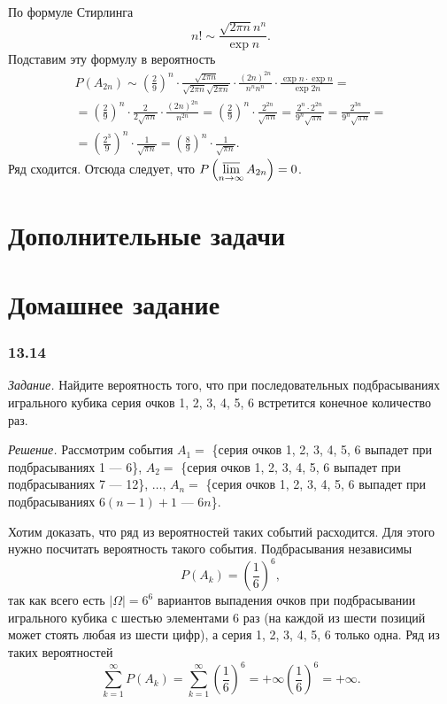 По формуле Стирлинга
$$n! \sim \frac{ \sqrt{2 \pi n} n^n}{\exp{n}}.$$
Подставим эту формулу в вероятность
\begin{equation*}
\begin{split}
P \left( A_{2n} \right) \sim
\left( \frac{2}{9} \right)^n \cdot
\frac{ \sqrt{2 \pi n}}{ \sqrt{2 \pi n} \sqrt{2 \pi n}} \cdot \frac{ \left( 2n \right)^{2n}}{n^n n^n} \cdot
\frac{\exp{n} \cdot \exp{n}}{ \exp{2n}} = \\
= \left( \frac{2}{9} \right)^n \cdot \frac{2}{2 \sqrt{ \pi n}} \cdot \frac{ \left( 2n \right)^{2n}}{n^{2n}} =
\left( \frac{2}{9} \right)^n \cdot \frac{2^{2n}}{ \sqrt{ \pi n}} =
\frac{2^n \cdot 2^{2n}}{9^n \sqrt{ \pi n}} =
\frac{2^{3n}}{9^n \sqrt{ \pi n}} = \\
= \left( \frac{2^3}{9} \right)^n \cdot \frac{1}{ \sqrt{ \pi n}} =
\left( \frac{8}{9} \right)^n \cdot \frac{1}{ \sqrt{ \pi n}}.
\end{split}
\end{equation*}
Ряд сходится.
Отсюда следует, что $P \left( \varlimsup \limits_{n \to \infty } A_{2n} \right) = 0$.


\section*{Дополнительные задачи}

\section*{Домашнее задание}

\subsubsection*{13.14}

\textit{Задание.} Найдите вероятность того, что при последовательных подбрасываниях игрального кубика серия очков 1, 2, 3, 4, 5, 6 встретится конечное количество раз.

\textit{Решение.}
Рассмотрим события $A_1 =$ \{серия очков 1, 2, 3, 4, 5, 6 выпадет при подбрасываниях 1 --- 6\},
$A_2 =$ \{серия очков 1, 2, 3, 4, 5, 6 выпадет при подбрасываниях 7 --- 12\},
$ \dotsc, \, A_n =$ \{серия очков 1, 2, 3, 4, 5, 6 выпадет при подбрасываниях $6(n-1)+1$ --- $6n$\}.

Хотим доказать, что ряд из вероятностей таких событий расходится.
Для этого нужно посчитать вероятность такого события.
Подбрасывания независимы
$$P \left( A_k \right) =
\left( \frac{1}{6} \right)^6,$$
так как всего есть $ \left| \Omega \right| = 6^6$ вариантов выпадения очков при подбрасывании игрального кубика с шестью элементами 6 раз
(на каждой из шести позиций может стоять любая из шести цифр),
а серия 1, 2, 3, 4, 5, 6 только одна.
Ряд из таких вероятностей
$$ \sum \limits_{k=1}^{ \infty } P \left( A_k \right) =
\sum \limits_{k=1}^{ \infty } \left( \frac{1}{6} \right)^6 =
+ \infty \left( \frac{1}{6} \right)^6 =
+ \infty.$$


